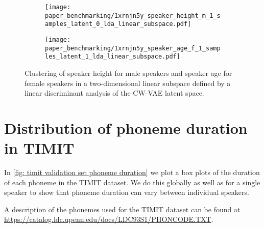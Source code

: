 {\begin{figure}
     \centering
     \hfill
     \begin{subfigure}[b]{0.48\textwidth}
         \centering
         \texttt{[image: paper\_benchmarking/1xrnjn5y\_speaker\_height\_m\_1\_samples\_latent\_0\_lda\_linear\_subspace.pdf]}
         \caption{}
         \label{fig: cwvae latent z1 height}
     \end{subfigure}
     \hfill
     \begin{subfigure}[b]{0.48\textwidth}
         \centering
         \texttt{[image: paper\_benchmarking/1xrnjn5y\_speaker\_age\_f\_1\_samples\_latent\_1\_lda\_linear\_subspace.pdf]}
         \caption{}
         \label{fig: cwvae latent z0 age}
     \end{subfigure}
    \caption[Clustering of speaker gender in 2D linear subspace of a CW-VAE latent space.]{ Clustering of speaker height for male speakers and  speaker age for female speakers in a two-dimensional linear subspace defined by a linear discriminant analysis of the CW-VAE latent space.}
    \label{fig: cwvae latent height}
\end{figure}




\section{Distribution of phoneme duration in TIMIT}\label{app: timit phoneme distributions}
In \cref{fig: timit validation set phoneme duration} we plot a box plots of the duration of each phoneme in the TIMIT dataset. We do this globally as well as for a single speaker to show that phoneme duration can vary between individual speakers. 

A description of the phonemes used for the TIMIT dataset can be found at \url{https://catalog.ldc.upenn.edu/docs/LDC93S1/PHONCODE.TXT}.

}
